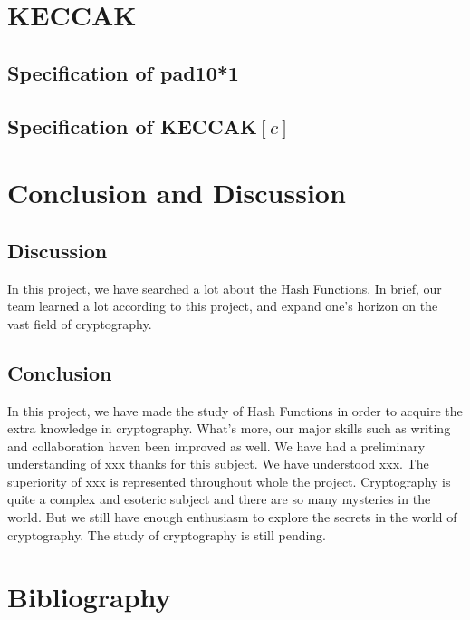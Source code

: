 \documentclass[12pt,a4paper,oneside]{report}
\begin{document}
\chapter{KECCAK}
\section{Specification of pad10*1}
\section{Specification of KECCAK$[c]$}

\chapter{  Conclusion and Discussion}
\section{Discussion}
In this project, we have searched a lot about the Hash Functions. In brief, our team learned a lot according to this project, and expand one's horizon on the vast field of cryptography.\\

\section{Conclusion}
In this project, we have made the study of Hash Functions in order to acquire the extra knowledge in cryptography. What's more, our major skills such as writing and collaboration haven been improved as well. We have had a preliminary understanding of xxx thanks for this subject. We have understood xxx. The superiority of xxx is represented throughout whole the project. Cryptography is quite a complex and esoteric subject and there are so many mysteries in the world. But we still have enough enthusiasm to explore the secrets in the world of cryptography. The study of cryptography is still pending.\\


\chapter{  Bibliography}
\noindent [1] \\
\end{document}
